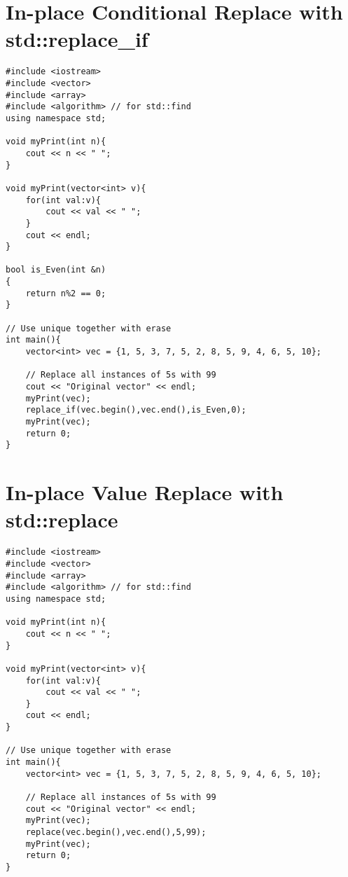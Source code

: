 \documentclass[12pt]{article}
\begin{document}
\section*{In-place Conditional Replace with std::replace_if}
\begin{verbatim}
#include <iostream>
#include <vector>
#include <array>
#include <algorithm> // for std::find
using namespace std;

void myPrint(int n){
    cout << n << " ";
}

void myPrint(vector<int> v){
    for(int val:v){
        cout << val << " ";
    }
    cout << endl;
}

bool is_Even(int &n)
{
    return n%2 == 0;
}

// Use unique together with erase
int main(){
    vector<int> vec = {1, 5, 3, 7, 5, 2, 8, 5, 9, 4, 6, 5, 10};

    // Replace all instances of 5s with 99
    cout << "Original vector" << endl;
    myPrint(vec);
    replace_if(vec.begin(),vec.end(),is_Even,0);
    myPrint(vec);
    return 0;
}
\end{verbatim}


\section*{In-place Value Replace with std::replace}
\begin{verbatim}
#include <iostream>
#include <vector>
#include <array>
#include <algorithm> // for std::find
using namespace std;

void myPrint(int n){
    cout << n << " ";
}

void myPrint(vector<int> v){
    for(int val:v){
        cout << val << " ";
    }
    cout << endl;
}

// Use unique together with erase
int main(){
    vector<int> vec = {1, 5, 3, 7, 5, 2, 8, 5, 9, 4, 6, 5, 10};

    // Replace all instances of 5s with 99
    cout << "Original vector" << endl;
    myPrint(vec);
    replace(vec.begin(),vec.end(),5,99);
    myPrint(vec);
    return 0;
}
\end{verbatim}
\end{document}
